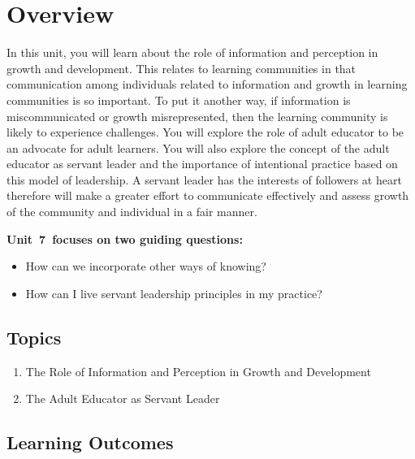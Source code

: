 \documentclass[
]{book}
\providecommand{\tightlist}{%
  \setlength{\itemsep}{0pt}\setlength{\parskip}{0pt}}
\begin{document}
\hypertarget{overview-6}{%
\section*{Overview}\label{overview-6}}

In this unit, you will learn about the role of information and perception in growth and development. This relates to learning communities in that communication among individuals related to information and growth in learning communities is so important. To put it another way, if information is miscommunicated or growth misrepresented, then the learning community is likely to experience challenges. You will explore the role of adult educator to be an advocate for adult learners. You will also explore the concept of the adult educator as servant leader and the importance of intentional practice based on this model of leadership. A servant leader has the interests of followers at heart therefore will make a greater effort to communicate effectively and assess growth of the community and individual in a fair manner.

\textbf{Unit~7~focuses on two guiding questions:}

\begin{itemize}
\tightlist
\item
  How can we incorporate other ways of knowing?\\
\item
  How can I live servant leadership principles in my practice?
\end{itemize}

\hypertarget{topics-6}{%
\subsection*{Topics}\label{topics-6}}

\begin{enumerate}
\def\labelenumi{\arabic{enumi}.}
\tightlist
\item
  The Role of Information and Perception in Growth and Development\\
\item
  The Adult Educator as Servant Leader
\end{enumerate}

\hypertarget{learning-outcomes-6}{%
\subsection*{Learning Outcomes}\label{learning-outcomes-6}}
\end{document}
